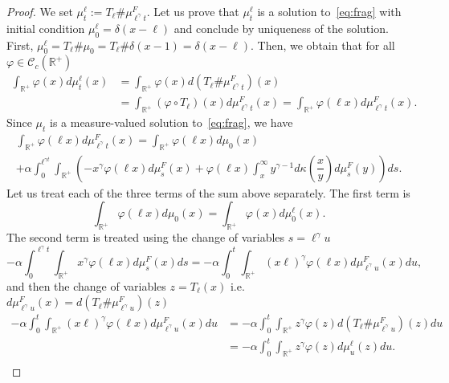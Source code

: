 \documentclass[10pt]{amsart}
\theoremstyle{definition}\newtheorem{defi}[theo]{Definition}\newtheorem{rema}[theo]{Remark}\newtheorem{exam}[theo]{Example}\newtheorem{exem}[theo]{Example}\newtheorem{nota}[theo]{Notation}
\newcommand*\dst{\displaystyle}
\renewcommand*\a{\alpha}
\newcommand*\R{\mathbb{R}}
\newcommand{\clC}{\mathcal{C}}
\begin{document}
\begin{proof}
We set $\mu_t^{\ell}:= T_{\ell} \# \mu_{\ell^{\gamma}t}^{F}$. Let us prove that $\mu_t^{\ell}$ is a solution to~\eqref{eq:frag} with initial condition $\mu_0^{\ell}=\delta(x-\ell)$ and conclude by uniqueness of the solution. First, $\mu_0^{\ell} = T_{\ell}\# \mu_0 = T_{\ell}\# \delta(x-1) =\delta(x-\ell)$. Then, we obtain that for all $\varphi\in \clC_c(\R^+)$
\begin{align*}
\dst\int_{\R^+} \varphi(x) d\mu_t^{\ell}(x) &= \dst\int_{\R^+} \varphi(x) d\left(T_{\ell}\# \mu_{\ell^{\gamma}t}^{F}\right)(x) \\
&= \dst\int_{\R^+} (\varphi\circ T_{\ell})(x) d \mu_{\ell^{\gamma}t}^{F}(x) = \dst\int_{\R^+} \varphi(\ell x) d \mu_{\ell^{\gamma}t}^{F}(x).
\end{align*}
Since $\mu_t$ is a measure-valued solution to~\eqref{eq:frag}, we have
\begin{multline*}
\dst\int_{\R^+} \varphi(\ell x) d \mu_{\ell^{\gamma}t}^{F}(x)
=
\int_{\R^+} \varphi(\ell x) d\mu_0(x)\\
+\a \dst\int_0^{\ell^{\gamma t}} \dst\int_{\R^+}
\left(-x^{\gamma} \varphi(\ell x)d\mu_s^{F}(x)+ \varphi(\ell x)\dst\int_x^{\infty}y^{\gamma-1} d\kappa\left(\dfrac{x}{y}\right)d\mu_s^{F}(y)\right)ds.
\end{multline*}
Let us treat each of the three terms of the sum above separately. The first term is
\begin{equation*}
\int_{\R^+} \varphi(\ell x) d\mu_0(x) =
\int_{\R^+} \varphi(x) d\mu_0^{\ell}(x).
\end{equation*}
The second term is treated using the change of variables $s=\ell^{\gamma}u$
\begin{equation*}
-\a \dst\int_0^{\ell^{\gamma} t} \dst\int_{\R^+} x^{\gamma} \varphi(\ell x)d\mu_s^{F}(x)ds= -\a \dst\int_0^{t} \dst\int_{\R^+}
\left(x\ell\right)^{\gamma} \varphi(\ell x)d\mu_{\ell^{\gamma}u}^{F}(x)du,
\end{equation*}
and then the change of variables $z=T_{\ell}(x)$ i.e. $d\mu_{\ell^{\gamma}u}^{F}(x)= d(T_{\ell} \#\mu_{\ell^{\gamma}u}^{F})(z)$
\begin{align*}
-\a \dst\int_0^{t} \dst\int_{\R^+}
\left(x\ell\right)^{\gamma} \varphi(\ell x)d\mu_{\ell^{\gamma}u}^{F}(x)du &= -\a \dst\int_0^{t} \dst\int_{\R^+} z^{\gamma} \varphi(z)d\left(T_{\ell} \# \mu_{\ell^{\gamma}u}^{F}\right)(z)du\\
&= -\a \dst\int_0^{t} \dst\int_{\R^+} z^{\gamma} \varphi(z)d\mu_u^{\ell}(z)du.\\

\end{align*}
\end{proof}
\end{document}
